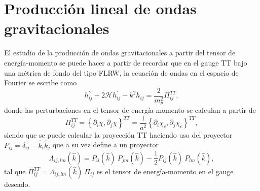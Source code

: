 \appendix
\chapter{Producción lineal de ondas gravitacionales} \label{sec:apexA}

El estudio de la producción de ondas gravitacionales a partir del tensor de energía-momento se puede hacer a partir de recordar que en el gauge TT bajo una métrica de fondo del tipo FLRW, la ecuación de ondas en el espacio de Fourier se escribe como 
\begin{equation}\label{eqn:GW_eq}
    h^{\prime \prime}_{ij} + 2 \mathcal{H} h^\prime_{ij} - k^2 h_{ij} = \frac{2}{m_p^2} \Pi_{ij}^{TT},
\end{equation}
donde las perturbaciones en el tensor de energía-momento se calculan a partir de
\begin{equation}
    \Pi^{TT}_{ij} = \left\{ \partial_i \chi, \partial_j \chi \right\}^{TT} = \frac{1}{a^2} \left\{ \partial_i \chi_c, \partial_j \chi_c \right\}^{TT},
\end{equation}
siendo que se puede calcular la proyección TT haciendo uso del proyector $P_{ij} = \delta_{ij} - \hat{k}_i \hat{k}_j$ que a su vez define a un proyector 
\begin{equation}
    \Lambda_{ij,lm} \left( \hat{k} \right) = P_{il} \left( \hat{k} \right) ~ P_{jm} \left( \hat{k} \right) - \frac{1}{2} P_{ij} \left( \hat{k} \right) ~ P_{lm} \left( \hat{k} \right),
\end{equation}
tal que $\Pi^{TT}_{ij} = \Lambda_{ij,lm} \left( \hat{k} \right) ~ \Pi_{ij}$ es el tensor de energía-momento en el gauge deseado.

